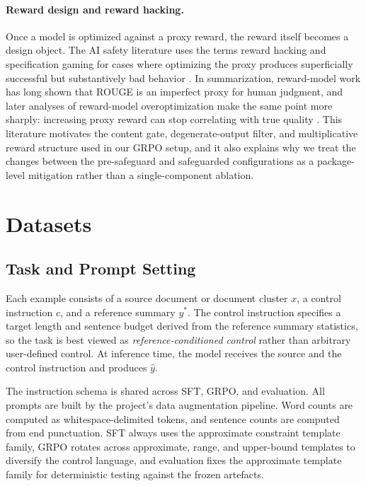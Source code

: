 \documentclass[11pt]{article}
\begin{document}
\paragraph{Reward design and reward hacking.}
Once a model is optimized against a proxy reward, the reward itself becomes a design object.
The AI safety literature uses the terms reward hacking and specification gaming for cases where optimizing the proxy produces superficially successful but substantively bad behavior \citep{amodei2016concrete,skalse2022rewardhacking}.
In summarization, reward-model work has long shown that ROUGE is an imperfect proxy for human judgment, and later analyses of reward-model overoptimization make the same point more sharply: increasing proxy reward can stop correlating with true quality \citep{gao2022scaling}.
This literature motivates the content gate, degenerate-output filter, and multiplicative reward structure used in our GRPO setup, and it also explains why we treat the changes between the pre-safeguard and safeguarded configurations as a package-level mitigation rather than a single-component ablation.

\section{Datasets}

\subsection{Task and Prompt Setting}
Each example consists of a source document or document cluster $x$, a control instruction $c$, and a reference summary $y^{*}$.
The control instruction specifies a target length and sentence budget derived from the reference summary statistics, so the task is best viewed as \emph{reference-conditioned control} rather than arbitrary user-defined control.
At inference time, the model receives the source and the control instruction and produces $\hat{y}$.

The instruction schema is shared across SFT, GRPO, and evaluation.
All prompts are built by the project's data augmentation pipeline.
Word counts are computed as whitespace-delimited tokens, and sentence counts are computed from end punctuation.
SFT always uses the approximate constraint template family, GRPO rotates across approximate, range, and upper-bound templates to diversify the control language, and evaluation fixes the approximate template family for deterministic testing against the frozen artefacts.
\end{document}

